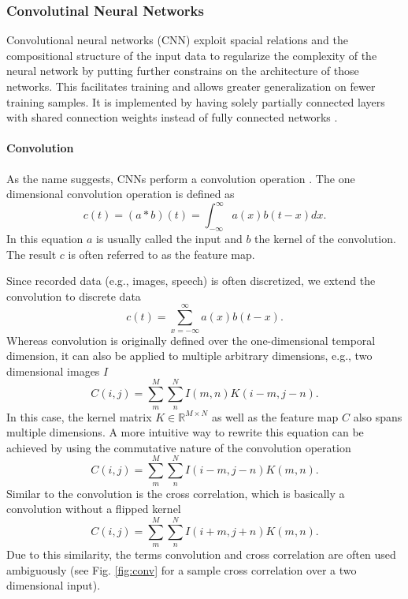 \subsubsection{Convolutinal Neural Networks} \label{c:cnns}

Convolutional neural networks (CNN) exploit spacial relations and the compositional structure of the input data to regularize the complexity of the neural network by putting further constrains on the architecture of those networks.
This facilitates training and allows greater generalization on fewer training samples.
It is implemented by having solely partially connected layers with shared connection weights instead of fully connected networks \cite{Goodfellow-et-al-2016-Book, lecun1989backpropagation}.    

\paragraph{Convolution} \label{c:convolution}

As the name suggests, CNNs perform a convolution operation \cite{Goodfellow-et-al-2016-Book}. The one dimensional convolution operation is defined as
\[
c(t) = (a * b)(t) = \int_{- \infty}^{\infty} a(x)b(t-x) dx.
\]
In this equation $a$ is usually called the input and $b$ the kernel of the convolution. The result $c$ is often referred to as the feature map.

Since recorded data (e.g., images, speech) is often discretized, we extend the convolution to discrete data
\[
c(t) = \sum_{x = - \infty}^{\infty} a(x)b(t-x).
\]
Whereas convolution is originally defined over the one-dimensional temporal dimension, it can also be applied to multiple arbitrary dimensions, e.g., two dimensional images $I$
\[
C(i,j) = \sum_m^M \sum_n^N I(m,n) K(i - m, j -n).
\]
In this case, the kernel matrix $K \in \mathbb{R}^{M \times N} $ as well as the feature map $C$ also spans multiple dimensions.
A more intuitive way to rewrite this equation can be achieved by using the commutative nature of the convolution operation
\[
C(i,j) = \sum_m^M \sum_n^N I(i - m,j - n) K(m, n).
\]
Similar to the convolution is the cross correlation, which is basically a convolution without a flipped kernel
\[
C(i,j) = \sum_m^M \sum_n^N I(i + m,j + n) K(m, n).
\]
Due to this similarity, the terms convolution and cross correlation are often used ambiguously (see Fig. \ref{fig:conv} for a sample cross correlation over a two dimensional input).

